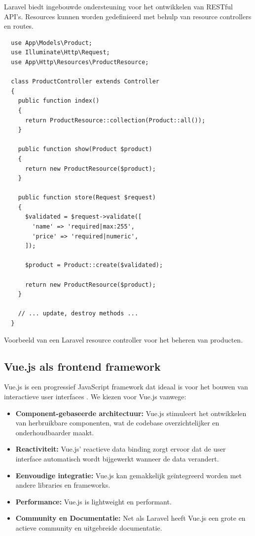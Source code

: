 Laravel biedt ingebouwde ondersteuning voor het ontwikkelen van RESTful API's. Resources kunnen worden gedefinieerd met behulp van resource controllers en routes.

\begin{listing}[H]
\begin{verbatim}
  use App\Models\Product;
  use Illuminate\Http\Request;
  use App\Http\Resources\ProductResource;
  
  class ProductController extends Controller
  {
    public function index()
    {
      return ProductResource::collection(Product::all());
    }

    public function show(Product $product)
    {
      return new ProductResource($product);
    }

    public function store(Request $request)
    {
      $validated = $request->validate([
        'name' => 'required|max:255',
        'price' => 'required|numeric',
      ]);

      $product = Product::create($validated);

      return new ProductResource($product);
    }

    // ... update, destroy methods ...
  }
\end{verbatim}
\caption[Voorbeeld van een Laravel resource controller]{Voorbeeld van een Laravel resource controller voor het beheren van producten.}
\label{lst:laravel_controller}
\end{listing}

\subsection{Vue.js als frontend framework}

Vue.js is een progressief JavaScript framework dat ideaal is voor het bouwen van interactieve user interfaces \autocite{VueJS}. We kiezen voor Vue.js vanwege:

\begin{itemize}
  \item \textbf{Component-gebaseerde architectuur:} Vue.js stimuleert het ontwikkelen van herbruikbare componenten, wat de codebase overzichtelijker en onderhoudbaarder maakt.
  \item \textbf{Reactiviteit:} Vue.js' reactieve data binding zorgt ervoor dat de user interface automatisch wordt bijgewerkt wanneer de data verandert.
  \item \textbf{Eenvoudige integratie:} Vue.js kan gemakkelijk geïntegreerd worden met andere libraries en frameworks.
  \item \textbf{Performance:} Vue.js is lightweight en performant.
  \item \textbf{Community en Documentatie:} Net als Laravel heeft Vue.js een grote en actieve community en uitgebreide documentatie.
\end{itemize}


